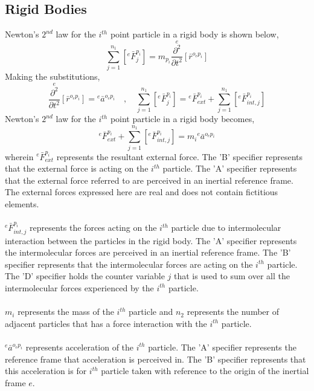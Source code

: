 \documentclass[class=report, 12pt, crop=false]{standalone}
\begin{document}
\begin{center}
\subsection{Rigid Bodies}
\begin{comment}
\end{comment}
Newton's $2^{nd}$ law for the $i^{th}$ point particle in a rigid body is shown below,
$$\sum^{n_{1}}_{j = 1}\left[{}^{e}\bar{F}^{p_{i}}_{j}\right] = m_{p_{i}}\overset{e}{\frac{\partial^{2}}{\partial t^{2}}}[\bar{r}^{o_{e}p_{i}}]$$
Making the substitutions,
\begin{equation}\overset{e}{\frac{\partial^{2}}{\partial t^{2}}}[\bar{r}^{o_{e}p_{i}}] = {}^{e}\bar{a}^{o_{e}p_{i}}\quad,\quad \sum^{n_{1}}_{j = 1}\left[{}^{e}\bar{F}^{p_{i}}_{j}\right] = {}^{e}\bar{F}^{p_{i}}_{ext} + \sum^{n_{1}}_{j = 1}\left[{}^{e}\bar{F}^{p_{i}}_{int,j}\right]\label{rigid-forces}\end{equation}
Newton's $2^{nd}$ law for the $i^{th}$ point particle in a rigid body becomes,
$${}^{e}\bar{F}^{p_{i}}_{ext} + \sum^{n_{1}}_{j = 1}\left[{}^{e}\bar{F}^{p_{i}}_{int,j}\right] = m_{i}{}^{e}\bar{a}^{o_{e}p_{i}}$$
wherein ${}^{e}\bar{F}^{p_{i}}_{ext}$ represents the resultant external force. The 'B' specifier represents that the external force is acting on the $i^{th}$ particle. The 'A' specifier represents that the external force referred to are perceived in an inertial reference frame. The external forces expressed here are real and does not contain fictitious elements.
\\~\\${}^{e}\bar{F}^{p_{i}}_{int,j}$ represents the forces acting on the $i^{th}$ particle due to intermolecular interaction between the particles in the rigid body. The 'A' specifier represents the intermolecular forces are perceived in an inertial reference frame. The 'B' specifier represents that the intermolecular forces are acting on the $i^{th}$ particle. The 'D' specifier holds the counter variable $j$ that is used to sum over all the intermolecular forces experienced by the $i^{th}$ particle. 
\\~\\$m_{i}$ represents the mass of the $i^{th}$ particle and $n_{2}$ represents the number of adjacent particles that has a force interaction with the $i^{th}$ particle.
\\~\\${}^{e}\bar{a}^{o_{e}p_{i}}$ represents acceleration of the $i^{th}$ particle. The 'A' specifier represents the reference frame that acceleration is perceived in. The 'B' specifier represents that this acceleration is for $i^{th}$ particle taken with reference to the origin of the inertial frame $e$.

\end{center}
\end{document}
